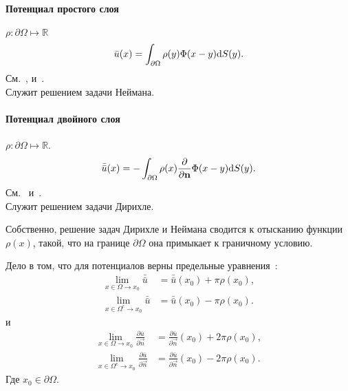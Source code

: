 \documentclass[12pt]{report}
\begin{document}
\paragraph{Потенциал простого слоя}%
$\rho: \partial\Omega \mapsto \mathbb{R}$
\begin{equation}
	\bar{u}(x) = \int_{\partial\Omega}\rho(y)\Phi(x-y)\mathrm d S(y).
\end{equation}
См.~\cite[стр.~346, ур-е (26)]{Tikhonov}, и~\cite[ур-е (5.1)]{Stanford:potential-theory}. \\
Служит решением задачи Неймана.
\paragraph{Потенциал двойного слоя}%
$\rho : \partial\Omega \mapsto \mathbb{R}$.
\begin{equation}
	\bar{\bar{u}}(x) = -\int_{\partial\Omega} \rho(x)\frac{\partial}{\partial\mathbf{n}}\Phi(x-y)\mathrm d S(y).
\end{equation}
См.~\cite[стр.~348, ур-е (28)]{Tikhonov} и~\cite[ур-е (5.2)]{Stanford:potential-theory}. \\
Служит решением задачи Дирихле.

Собственно, решение задач Дирихле и Неймана сводится к отысканию функции $\rho(x)$, такой, что на границе $\partial\Omega$ она примыкает к граничному условию.~\cite[стр.~15]{Stanford:potential-theory} 

\begin{rmk}
	Дело в том, что для потенциалов верны предельные уравнения~\cite[стр.~353, ур-е (39)]{Tikhonov}:
	\begin{align*}
		\lim_{x\in\Omega \to x_0}\bar{\bar{u}} &= \bar{\bar{u}}(x_0) + \pi\rho(x_0),\\
		\lim_{x\in\Omega^c \to x_0}\bar{\bar{u}} &= \bar{\bar{u}}(x_0) - \pi\rho(x_0).
	\end{align*}
	и~\cite[стр.~359, ур-е (48)]{Tikhonov}
	\begin{align*}
		\lim_{x\in\Omega \to x_0}\frac{\partial\bar{u}}{\partial\vec n} &= \frac{\partial\bar{u}}{\partial\vec n}(x_0) + 2\pi\rho(x_0), \\
		\lim_{x\in\Omega^c \to x_0}\frac{\partial\bar{u}}{\partial\vec n} &= \frac{\partial\bar{u}}{\partial\vec n}(x_0) - 2\pi\rho(x_0).
	\end{align*}
	Где $x_0\in\partial\Omega$.
\end{rmk}
\end{document}
